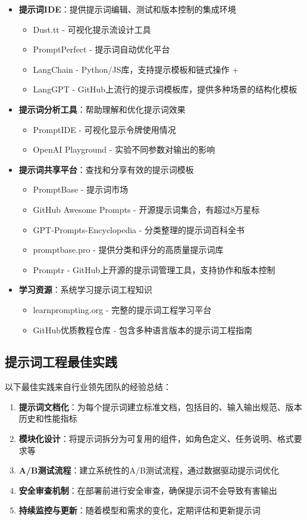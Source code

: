 \documentclass[12pt]{ctexart}
\begin{document}
\begin{itemize}
  \item \textbf{提示词IDE}：提供提示词编辑、测试和版本控制的集成环境
    \begin{itemize}
      \item Dust.tt - 可视化提示流设计工具
      \item PromptPerfect - 提示词自动优化平台
      \item LangChain - Python/JS库，支持提示模板和链式操作
+     \item LangGPT - GitHub上流行的提示词模板库，提供多种场景的结构化模板
    \end{itemize}
  \item \textbf{提示词分析工具}：帮助理解和优化提示词效果
    \begin{itemize}
      \item PromptIDE - 可视化显示令牌使用情况
      \item OpenAI Playground - 实验不同参数对输出的影响
    \end{itemize}
  \item \textbf{提示词共享平台}：查找和分享有效的提示词模板
    \begin{itemize}
      \item PromptBase - 提示词市场
      \item GitHub Awesome Prompts - 开源提示词集合，有超过8万星标
      \item GPT-Prompts-Encyclopedia - 分类整理的提示词百科全书
      \item promptbase.pro - 提供分类和评分的高质量提示词库
      \item Promptr - GitHub上开源的提示词管理工具，支持协作和版本控制
    \end{itemize}
  \item \textbf{学习资源}：系统学习提示词工程知识
    \begin{itemize}
      \item learnprompting.org - 完整的提示词工程学习平台
      \item GitHub优质教程仓库 - 包含多种语言版本的提示词工程指南
    \end{itemize}
\end{itemize}

\subsection{提示词工程最佳实践}
以下最佳实践来自行业领先团队的经验总结：

\begin{enumerate}
  \item \textbf{提示词文档化}：为每个提示词建立标准文档，包括目的、输入输出规范、版本历史和性能指标
  \item \textbf{模块化设计}：将提示词拆分为可复用的组件，如角色定义、任务说明、格式要求等
  \item \textbf{A/B测试流程}：建立系统性的A/B测试流程，通过数据驱动提示词优化
  \item \textbf{安全审查机制}：在部署前进行安全审查，确保提示词不会导致有害输出
  \item \textbf{持续监控与更新}：随着模型和需求的变化，定期评估和更新提示词
\end{enumerate}
\end{document}
